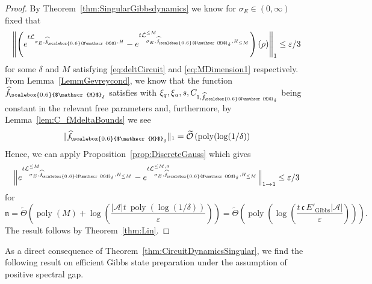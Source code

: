 \documentclass[11pt]{amsart}
\newcommand{\1}{\mathbbm{1}}
\newcommand{\eps}{\varepsilon}
\renewcommand{\epsilon}{\varepsilon}
\newcommand{\cA}{\mathcal{A}}
\newcommand{\hatfM}{\widehat{f}_{\!\scalebox{0.6}{$\mathscr{M}$}}
}
\newcommand{\hatfMdelta}{\widehat{f}_{\!\scalebox{0.6}{$\mathscr{M}$}_\delta}}
\theoremstyle{plain}
\theoremstyle{definition}
\theoremstyle{remark}
\numberwithin{equation}{section}
\begin{document}
\begin{proof}
By Theorem~\ref{thm:SingularGibbsdynamics} we know for $\sigma_E\in(0,\infty)$ fixed that
\begin{align*}
\left\|\left(e^{t\mathcal{L}_{\sigma_E,\hatfM,H}}-e^{t\mathcal{L}^{\le M}_{\sigma_E,\hatfMdelta,H_{\le M}}}\right)(\rho)\right\|_1  \le \eps/3 
\end{align*}
for some $\delta$ and $M$ satisfying \eqref{eq:deltCircuit} and \eqref{eq:MDimension1} respectively.
From Lemma~\ref{LemmGevreycond}, we know that the function $\hatfMdelta$ satisfies  with $\xi_q,\xi_u,s,C_{1,\hatfMdelta}$ being constant in the relevant free parameters and, furthermore, by Lemma~\ref{lem:C_fMdeltaBounds} we see
\begin{align*}
\|\hatfMdelta\|_1 = \widetilde{\mathcal{O}}\left(\operatorname{poly}(\log(1/\delta)\right)
\end{align*}
Hence, we can apply  Proposition~\ref{prop:DiscreteGauss} which gives
\begin{align*}
\Big\|e^{t\mathcal{L}^{\le M}_{\sigma_E,\hatfMdelta,H_{\le M}}}-e^{t\mathcal{L}^{\le M,\mathfrak{n}}_{\sigma_E,\hatfMdelta,H_{\le M}}}\Big\|_{1\to 1}\le \epsilon/3
\end{align*}
for  $$\mathfrak{n} = \widetilde\Theta\left(\operatorname{poly}(M)+ \log\left(\frac{|\cA|t\  \operatorname{poly}\!\left(\log(1/\delta)\right)}{\eps}\right) \right) =\widetilde \Theta\left( \operatorname{poly}\left(\log\left(\frac{t\,\mathfrak{c}\,E'_{\operatorname{Gibbs}}|\cA|}{\eps}\right)\right)\right).$$ The result follows by Theorem~\ref{thm:Lin}.

\end{proof}

As a direct consequence of Theorem~\ref{thm:CircuitDynamicsSingular}, we find the following result on efficient Gibbs state preparation under the assumption of positive spectral gap.
\end{document}
